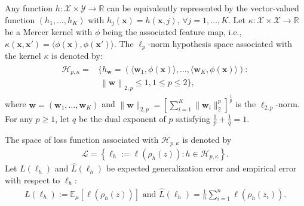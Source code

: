 \documentclass{article}
\begin{document}
Any function $h:\mathcal{X}\times\mathcal{Y}\rightarrow \mathbb{R}$ can be equivalently represented by the vector-valued function
$(h_1,\ldots,h_K)$ with $h_j(\mathbf x)=h(\mathbf x,j)$, $\forall j=1,\ldots,K$.
Let $\kappa:\mathcal{X}\times\mathcal{X}\rightarrow\mathbb{R}$ be a Mercer kernel with $\phi$ being the associated feature map,
i.e., $\kappa(\mathbf x,\mathbf x')=\langle \phi(\mathbf x),\phi(\mathbf x')\rangle$.
The $\ell_p$-norm hypothesis space associated with the kernel $\kappa$ is denoted by:
 \begin{align}
 \label{hypothspapce}
   \begin{aligned}
   \mathcal{H}_{p,\kappa}=&\Big\{h_\mathbf{w}=\left(\langle \mathbf w_1,\phi(\mathbf x)\rangle,\ldots, \langle\mathbf w_K,\phi(\mathbf x)\rangle\right):\\
   &~\left\|\mathbf  w \right\|_{2,p}\leq 1, 1\leq p\leq 2
  \Big\},
   \end{aligned}
 \end{align}
 where $\mathbf w=(\mathbf w_1,\ldots,\mathbf w_K)$ and $\|\mathbf w\|_{2,p}=\left[\sum_{i=1}^K\|\mathbf w_i\|_2^p\right]^{\frac{1}{p}}$
 is the $\ell_{2,p}$-norm.
 For any $p\geq 1$, let $q$ be the dual exponent of $p$ satisfying $\frac{1}{p}+\frac{1}{q}=1$.

The space of loss function associated with $\mathcal{H}_{p,\kappa}$  is denoted by
\begin{align}
\label{eq-sapce-loss-functions}
  \mathcal{L}=\left\{\ell_h:=\ell(\rho_h(z)):h\in\mathcal{H}_{p,\kappa}\right\}.
\end{align}
Let $L(\ell_h)$ and  $\hat{L}(\ell_h)$ be expected generalization error and
 empirical error  with respect to $\ell_h$:
\begin{align*}
  L(\ell_h):=\mathbb{E}_\mu[\ell(\rho_h(z))] \text{ and } \hat{L}(\ell_h)=\frac{1}{n}\sum_{i=1}^n\ell(\rho_h(z_i)).
\end{align*}




\end{document}
